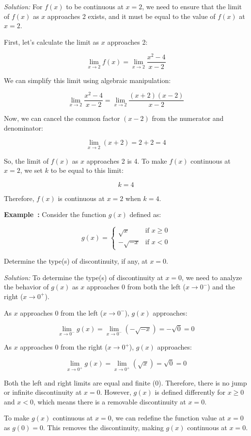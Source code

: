 \documentclass[a4paper,12pt]{book}
\newenvironment{solution}[1][]
{\par\noindent\textit{Solution:} \rmfamily}{\medskip}
\newcounter{example}
\newenvironment{example}[1][\theexample]
  {\refstepcounter{example}\par\medskip\noindent\textbf{Example~#1:} \rmfamily}
  {\medskip}
\begin{document}
\begin{solution}
For \(f(x)\) to be continuous at \(x = 2\), we need to ensure that the limit of \(f(x)\) as \(x\) approaches 2 exists, and it must be equal to the value of \(f(x)\) at \(x = 2\). 

First, let's calculate the limit as \(x\) approaches 2:

\[
\lim_{{x \to 2}} f(x) = \lim_{{x \to 2}} \frac{x^2 - 4}{x - 2}
\]

We can simplify this limit using algebraic manipulation:

\[
\lim_{{x \to 2}} \frac{x^2 - 4}{x - 2} = \lim_{{x \to 2}} \frac{(x + 2)(x - 2)}{x - 2}
\]

Now, we can cancel the common factor \((x - 2)\) from the numerator and denominator:

\[
\lim_{{x \to 2}} (x + 2) = 2 + 2 = 4
\]

So, the limit of \(f(x)\) as \(x\) approaches 2 is 4. To make \(f(x)\) continuous at \(x = 2\), we set \(k\) to be equal to this limit:

\[
k = 4
\]

Therefore, \(f(x)\) is continuous at \(x = 2\) when \(k = 4\).
\end{solution}

\begin{example}
Consider the function \(g(x)\) defined as:

\[
g(x) =
\begin{cases}
  \sqrt{x} & \text{if } x \geq 0 \\
  -\sqrt{-x} & \text{if } x < 0
\end{cases}
\]

Determine the type(s) of discontinuity, if any, at \(x = 0\).
\end{example}

\begin{solution}
To determine the type(s) of discontinuity at \(x = 0\), we need to analyze the behavior of \(g(x)\) as \(x\) approaches 0 from both the left (\(x \to 0^-\)) and the right (\(x \to 0^+\)).

As \(x\) approaches 0 from the left (\(x \to 0^-\)), \(g(x)\) approaches:

\[
\lim_{{x \to 0^-}} g(x) = \lim_{{x \to 0^-}} (-\sqrt{-x}) = -\sqrt{0} = 0
\]

As \(x\) approaches 0 from the right (\(x \to 0^+\)), \(g(x)\) approaches:

\[
\lim_{{x \to 0^+}} g(x) = \lim_{{x \to 0^+}} (\sqrt{x}) = \sqrt{0} = 0
\]

Both the left and right limits are equal and finite (\(0\)). Therefore, there is no jump or infinite discontinuity at \(x = 0\). However, \(g(x)\) is defined differently for \(x \geq 0\) and \(x < 0\), which means there is a removable discontinuity at \(x = 0\).

To make \(g(x)\) continuous at \(x = 0\), we can redefine the function value at \(x = 0\) as \(g(0) = 0\). This removes the discontinuity, making \(g(x)\) continuous at \(x = 0\).
\end{solution}
\end{document}
